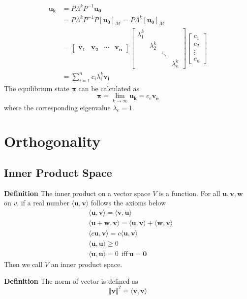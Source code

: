 \documentclass[11pt]{article}
\begin{document}
\begin{equation}
\begin{aligned}
    \bm{u_{k}} &= P\Lambda^{k}P^{-1}\bm{u_0} \\
    &= P\Lambda^k P^{-1} P[\bm{u_0}]_{\mathcal{M}} = P\Lambda^k[\bm{u_0}]_{\mathcal{M}}\\
    &= \begin{bmatrix}
    \bm{v_1} & \bm{v_2} & \cdots &\bm{v_n}
    \end{bmatrix} \begin{bmatrix}
    \lambda_1^k & & & \\
    & \lambda_2^k & & \\
    & & \ddots & \\
    & & & \lambda_n^k
    \end{bmatrix} \begin{bmatrix}
    c_1 \\ c_2 \\ \vdots \\ c_n
    \end{bmatrix} \\
    &= \sum_{i=1}^n c_i\lambda_i^k \bm{v_i}
\end{aligned}
\end{equation}
The equilibrium state $\bm{\pi}$ can be calculated as
\begin{equation}
    \bm{\pi} = \lim_{k\rightarrow \infty} \bm{u_k} = c_e \bm{v_e}
\end{equation}
where the corresponding eigenvalue $\lambda_e = 1$.
\section{Orthogonality}
\subsection{Inner Product Space}
\noindent \textbf{Definition} The inner product on a vector space $V$ is a function. For all $\bm{u}, \bm{v}, \bm{w}$ on $v$, if a real number $\langle \bm{u},\bm{v} \rangle$ follows the axioms below
\begin{equation}
\begin{aligned}
    &\langle \bm{u},\bm{v} \rangle = \langle \bm{v},\bm{u} \rangle  \\
    &\langle \bm{u}+\bm{w} , \bm{v} \rangle = \langle \bm{u},\bm{v} \rangle + \langle \bm{w}, \bm{v} \rangle \\
    &\langle c\bm{u},\bm{v} \rangle = c\langle \bm{u},\bm{v} \rangle \\
    &\langle \bm{u},\bm{u} \rangle \geq 0 \\
    &\langle \bm{u} , \bm{u} \rangle = 0~~\text{iff}~\bm{u} = \bm{0}
\end{aligned}
\end{equation}
Then we call $V$ an inner product space. \par 
\noindent \textbf{Definition} The norm of vector is defined as
\begin{equation}
    \Vert \bm{v} \Vert^2 = \langle \bm{v}, \bm{v} \rangle
\end{equation}
\end{document}
